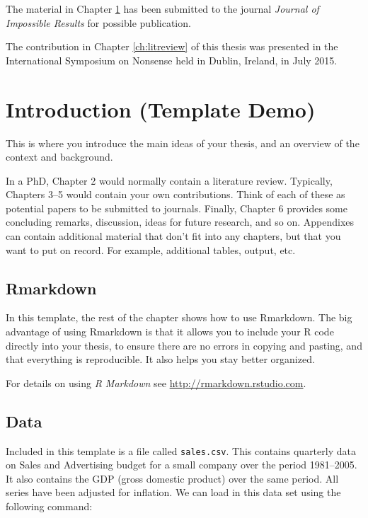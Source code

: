 \documentclass{aucklandthesis}
\begin{document}
The material in Chapter \ref{ch:intro} has been submitted to the journal \emph{Journal of Impossible Results} for possible publication.

The contribution in Chapter \ref{ch:litreview} of this thesis was presented in the International Symposium on Nonsense held in Dublin, Ireland, in July 2015.

\clearpage{}\setcounter{page}{0}

\hypertarget{ch:intro}{%
\chapter{Introduction (Template Demo)}\label{ch:intro}}

This is where you introduce the main ideas of your thesis, and an overview of the context and background.

In a PhD, Chapter 2 would normally contain a literature review. Typically, Chapters 3--5 would contain your own contributions. Think of each of these as potential papers to be submitted to journals. Finally, Chapter 6 provides some concluding remarks, discussion, ideas for future research, and so on. Appendixes can contain additional material that don't fit into any chapters, but that you want to put on record. For example, additional tables, output, etc.

\hypertarget{rmarkdown}{%
\section{Rmarkdown}\label{rmarkdown}}

In this template, the rest of the chapter shows how to use Rmarkdown. The big advantage of using Rmarkdown is that it allows you to include your R code directly into your thesis, to ensure there are no errors in copying and pasting, and that everything is reproducible. It also helps you stay better organized.

For details on using \emph{R Markdown} see \url{http://rmarkdown.rstudio.com}.

\hypertarget{data}{%
\section{Data}\label{data}}

Included in this template is a file called \texttt{sales.csv}. This contains quarterly data on Sales and Advertising budget for a small company over the period 1981--2005. It also contains the GDP (gross domestic product) over the same period. All series have been adjusted for inflation. We can load in this data set using the following command:
\end{document}

